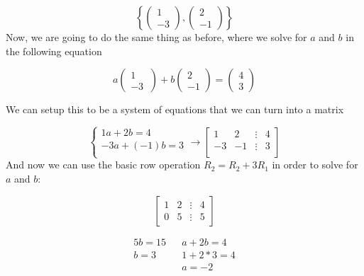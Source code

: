 \begin{problem}
    \begin{equation}
      \left\{
        \begin{pmatrix}
          1\\-3
        \end{pmatrix}
        ,
        \begin{pmatrix}
          2\\-1
        \end{pmatrix}
      \right\}
    \end{equation}
    Now, we are going to do the same thing as before, where we solve for $a$ and $b$ in the following equation

    \begin{equation}
      a
      \begin{pmatrix}
        1\\-3\
      \end{pmatrix}
      +b
      \begin{pmatrix}
        2\\-1
      \end{pmatrix}
      =
      \begin{pmatrix}
        4\\3
      \end{pmatrix}
    \end{equation}

    We can setup this to be a system of equations that we can turn into a matrix

    \begin{equation}
      \begin{cases}
        1a+2b=4\\
        -3a+(-1)b=3\\
      \end{cases}
      \to
      \begin{bmatrix}
        1&2&\vdots&4\\
        -3&-1&\vdots&3\\
      \end{bmatrix}
    \end{equation}
    And now we can use the basic row operation $R_2=R_2+3R_1$ in order to solve for $a$ and $b$:

    \begin{equation}
      \begin{bmatrix}
        1&2&\vdots&4\\
        0&5&\vdots&5
      \end{bmatrix}
    \end{equation}

    \begin{align}
      5b=15 && a+2b=4\\
      b=3 && 1+2*3=4\\
      && a=-2
    \end{align}
  \end{problem}
  
